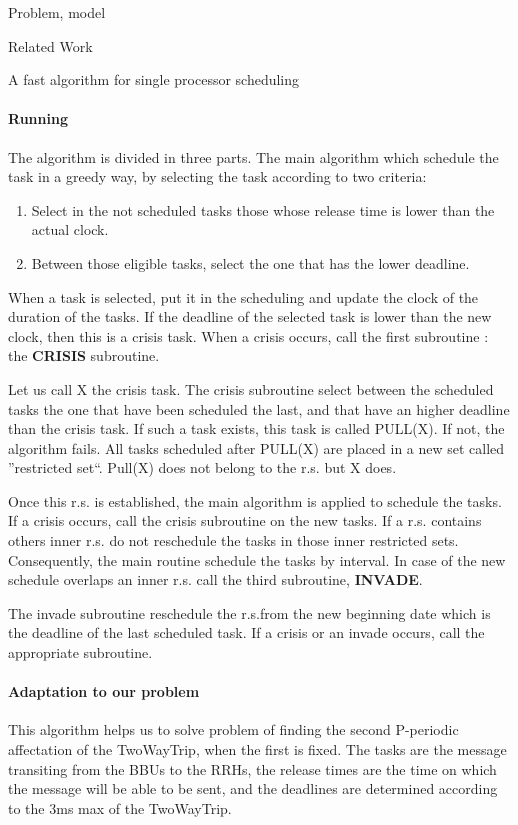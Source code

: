 \documentclass[a4paper,10pt]{report}
\begin{document}
\begin{chapter}{Problem, model}
\begin{section}{Related Work}
\begin{subsection}{A fast algorithm for single processor scheduling}
\paragraph{Running}
The algorithm is divided in three parts.
The main algorithm which schedule the task in a greedy way, by selecting the task according to two criteria:
\begin{enumerate}
 \item Select in the not scheduled tasks those whose release time is lower than the actual clock.
 \item Between those eligible tasks, select the one that has the lower deadline.
\end{enumerate}

When a task is selected, put it in the scheduling and update the clock of the duration of the tasks.
If the deadline of the selected task is lower than the new clock, then this is a crisis task.
When a crisis occurs, call the first subroutine : the {\bf CRISIS} subroutine.

Let us call X the crisis task.
The crisis subroutine select between the scheduled tasks the one that have been scheduled the last, and that have an higher deadline than the crisis task.
If such a task exists, this task is called PULL(X). If not, the algorithm fails.
All tasks scheduled after PULL(X) are placed in a new set called ''restricted set``.
Pull(X) does not belong to the r.s. but X does.

Once this r.s. is established, the main algorithm is applied to schedule the tasks. If a crisis occurs, call the crisis subroutine on the new tasks.
If a r.s. contains others inner r.s. do not reschedule the tasks in those inner restricted sets. Consequently, the main routine schedule 
the tasks by interval. In case of the new schedule overlaps an inner r.s. call the third subroutine, {\bf INVADE}.

The invade subroutine reschedule the r.s.from the new beginning date which is the deadline of the last scheduled task. If a crisis or an invade occurs,
call the appropriate subroutine.

\paragraph{Adaptation to our problem}
This algorithm helps us to solve problem of finding the second P-periodic affectation of the TwoWayTrip, when the first is fixed. 
The tasks are the message transiting from the BBUs to the RRHs, the release times are the time on which the message will be able to be sent,
and the deadlines are determined according to the 3ms max of the TwoWayTrip.


\end{subsection}
\end{section}
\end{chapter}
\end{document}
